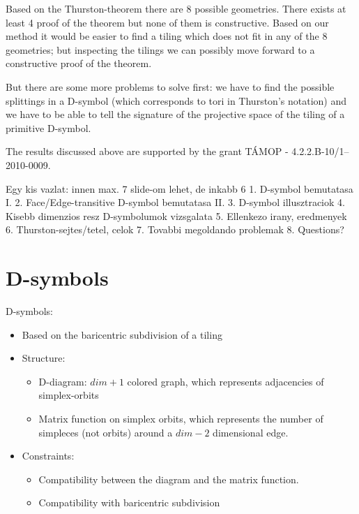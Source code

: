 \begin{frame}
Based on the Thurston-theorem there are 8 possible geometries.  There exists at
least 4 proof of the theorem but none of them is constructive. Based on our
method it would be easier to find a tiling which does not fit in any of the 8
geometries; but inspecting the tilings we can possibly move forward to a
constructive proof of the theorem.
\vfill

But there are some more problems to solve first: we have to find the possible
splittings in a D-symbol (which corresponds to tori in Thurston's notation)
and we have to be able to tell the signature of the projective space of the
tiling of a primitive D-symbol.
\vfill

The results discussed above are supported by the grant TÁMOP -
4.2.2.B-10/1--2010-0009.

\end{frame}

Egy kis vazlat:
innen max. 7 slide-om lehet, de inkabb 6
1. D-symbol bemutatasa I.
2. Face/Edge-transitive D-symbol bemutatasa II.
3. D-symbol illusztraciok
4. Kisebb dimenzios resz D-symbolumok vizsgalata
5. Ellenkezo irany, eredmenyek
6. Thurston-sejtes/tetel, celok
7. Tovabbi megoldando problemak
8. Questions?

\section{D-symbols}
\begin{frame}
  D-symbols:
  \begin{itemize}
    \item Based on the baricentric subdivision of a tiling
    \item Structure:
      \begin{itemize}
	\item D-diagram: $dim+1$ colored graph, which represents adjacencies of
	  simplex-orbits
	\item Matrix function on simplex orbits, which represents the number of
	  simpleces (not orbits) around a $dim-2$ dimensional edge.
      \end{itemize}
    \item Constraints:
      \begin{itemize}
	\item Compatibility between the diagram and the matrix function.
	\item Compatibility with baricentric subdivision
      \end{itemize}
  \end{itemize}
\end{frame}

